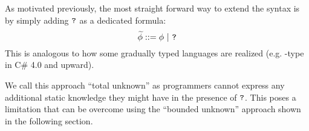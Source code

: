 As motivated previously, the most straight forward way to extend the syntax is by simply adding $\textup{\texttt{?}}$ as a dedicated formula:
\begin{displaymath}
\widetilde{\phi} ::= \phi ~|~ \textup{\texttt{?}}
\end{displaymath}
This is analogous to how some gradually typed languages are realized (e.g. -type in C\# 4.0 and upward).


We call this approach “total unknown” as programmers cannot express any additional static knowledge they might have in the presence of $\textup{\texttt{?}}$.
This poses a limitation that can be overcome using the “bounded unknown” approach shown in the following section.

